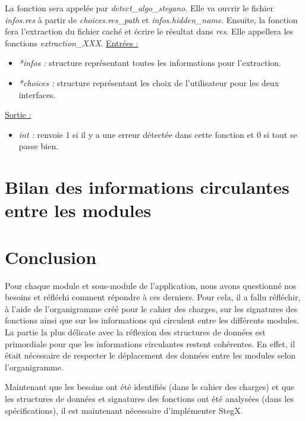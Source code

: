 \documentclass[11pt]{article}
\begin{document}
La fonction sera appelée par \textit{detect\_algo\_stegano}.
Elle va ouvrir le fichier \textit{infos.res} à partir de 
\textit{choices.res\_path} et \textit{infos.hidden\_name}. 
Ensuite, la fonction fera l'extraction du fichier caché et écrire le résultat 
dans \textit{res}. 
Elle appellera les fonctions \textit{extraction\_XXX}. 
\newline
\underline{Entrées :} 
\begin{itemize}
\item \textit{*infos :} structure représentant toutes les informations pour 
l'extraction.  
\item \textit{*choices :} structure représentant les choix de 
l'utilisateur pour les deux interfaces. 
\end{itemize}
\underline{Sortie :} 
\begin{itemize}
\item \textit{int :} renvoie 1 si il y a une erreur détectée dans cette 
fonction et 0 si tout se passe bien.  
\newline 
\end{itemize}

\section{Bilan des informations circulantes entre les modules}

\section{Conclusion}

Pour chaque module et sous-module de l'application, nous avons questionné nos 
besoins et réfléchi comment répondre à ces derniers. Pour cela, il a fallu 
réfléchir, à l'aide de l'organigramme créé pour le cahier des charges, 
sur les signatures des fonctions ainsi que sur les informations qui circulent 
entre les différents modules. 
La partie la plus délicate avec la réflexion des structures de données 
est primordiale pour que les informations circulantes restent cohérentes. 
En effet, il était nécessaire de respecter le déplacement des données entre 
les modules selon l'organigramme. 

Maintenant que les besoins ont été identifiés (dans le cahier des charges) 
et que les structures de données et signatures des fonctions ont été 
analysées (dans les spécifications), il est maintenant nécessaire 
d'implémenter StegX. 
\end{document}
